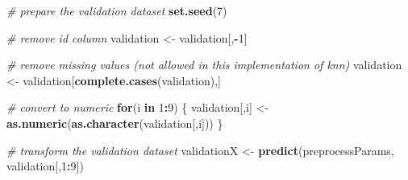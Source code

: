 \documentclass[]{book}
\newenvironment{Shaded}{\begin{snugshade}}{\end{snugshade}}
\newcommand{\CommentTok}[1]{\textcolor[rgb]{0.56,0.35,0.01}{\textit{#1}}}
\newcommand{\ControlFlowTok}[1]{\textcolor[rgb]{0.13,0.29,0.53}{\textbf{#1}}}
\newcommand{\DecValTok}[1]{\textcolor[rgb]{0.00,0.00,0.81}{#1}}
\newcommand{\KeywordTok}[1]{\textcolor[rgb]{0.13,0.29,0.53}{\textbf{#1}}}
\newcommand{\NormalTok}[1]{#1}
\newcommand{\OperatorTok}[1]{\textcolor[rgb]{0.81,0.36,0.00}{\textbf{#1}}}
\newcommand{\StringTok}[1]{\textcolor[rgb]{0.31,0.60,0.02}{#1}}
\begin{document}
\begin{Shaded}
\begin{Highlighting}[]
\CommentTok{# prepare the validation dataset}
\KeywordTok{set.seed}\NormalTok{(}\DecValTok{7}\NormalTok{)}

\CommentTok{# remove id column}
\NormalTok{validation <-}\StringTok{ }\NormalTok{validation[,}\OperatorTok{-}\DecValTok{1}\NormalTok{]}

\CommentTok{# remove missing values (not allowed in this implementation of knn)}
\NormalTok{validation <-}\StringTok{ }\NormalTok{validation[}\KeywordTok{complete.cases}\NormalTok{(validation),]}

\CommentTok{# convert to numeric}
\ControlFlowTok{for}\NormalTok{(i }\ControlFlowTok{in} \DecValTok{1}\OperatorTok{:}\DecValTok{9}\NormalTok{) \{}
\NormalTok{    validation[,i] <-}\StringTok{ }\KeywordTok{as.numeric}\NormalTok{(}\KeywordTok{as.character}\NormalTok{(validation[,i]))}
\NormalTok{\}}

\CommentTok{# transform the validation dataset}
\NormalTok{validationX <-}\StringTok{ }\KeywordTok{predict}\NormalTok{(preprocessParams, validation[,}\DecValTok{1}\OperatorTok{:}\DecValTok{9}\NormalTok{])}
\end{Highlighting}
\end{Shaded}
\end{document}
